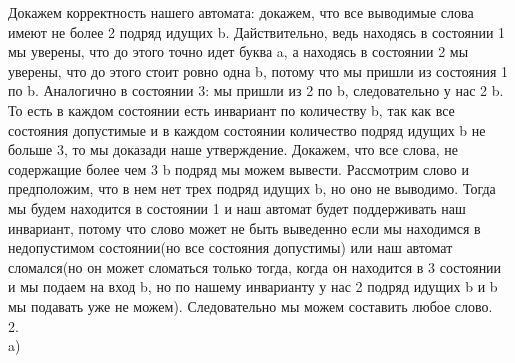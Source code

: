 \documentclass[a4paper,12pt]{article}
\begin{document}
Докажем корректность нашего автомата: докажем, что все выводимые слова имеют не более 2 подряд идущих b. Дайствительно, ведь находясь в состоянии  1 мы уверены, что до этого точно идет буква a, а находясь в состоянии 2 мы уверены, что до этого стоит ровно одна  b, потому что мы пришли из состояния 1 по b.  Аналогично в состоянии 3: мы пришли из 2 по b, следовательно у нас 2 b. То есть в каждом состоянии есть инвариант по количеству b, так как все состояния допустимые и в каждом состоянии количество подряд идущих b не больше 3, то мы доказади наше утверждение. Докажем, что все слова, не содержащие более чем 3 b подряд мы можем вывести. Рассмотрим слово и предположим, что в нем нет трех подряд идущих b, но оно не выводимо. Тогда мы будем находится в состоянии 1 и наш автомат будет поддерживать наш инвариант, потому что слово может не быть выведенно если мы находимся в недопустимом состоянии(но все состояния допустимы) или наш автомат сломался(но он может сломаться только тогда, когда он находится в 3 состоянии и мы подаем на вход b, но по нашему инварианту у нас 2 подряд идущих b и b  мы подавать уже не можем). Следовательно мы можем составить любое слово.\\
2.\\
a)\\
\begin{center} 
\end{center}
\end{document}
